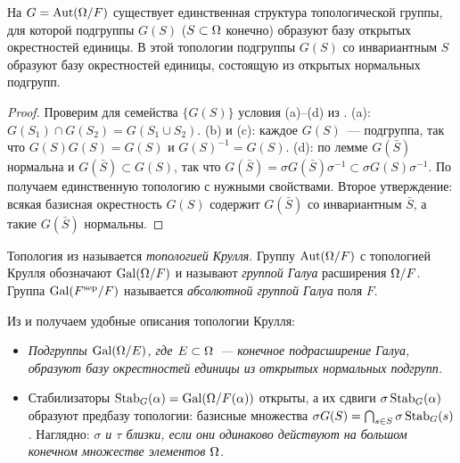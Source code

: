 \begin{proposition}[7.6]
На $G=\operatorname{Aut}(\Omega/F)$ существует единственная структура топологической группы, для которой подгруппы $G(S)$ ($S\subset\Omega$
конечно) образуют базу открытых окрестностей единицы. В этой топологии подгруппы $G(S)$ со инвариантным $S$ образуют базу
окрестностей единицы, состоящую из открытых нормальных подгрупп.
\end{proposition}

\begin{proof}
Проверим для семейства $\{G(S)\}$ условия (a)--(d) из . (a): $G(S_1)\cap G(S_2)=G(S_1\cup S_2)$. (b) и (c): каждое
$G(S)$~--- подгруппа, так что $G(S)G(S)=G(S)$ и $G(S)^{-1}=G(S)$. (d): по лемме  $G(\bar S)$ нормальна и
$G(\bar S)\subset G(S)$, так что $G(\bar S)=\sigma G(\bar S)\sigma^{-1}\subset\sigma G(S)\sigma^{-1}$. По  получаем
единственную топологию с нужными свойствами. Второе утверждение: всякая базисная окрестность $G(S)$ содержит $G(\bar S)$
со инвариантным $\bar S$, а такие $G(\bar S)$ нормальны.
\end{proof}

\begin{definition}
Топология из  называется \emph{топологией Крулля}. Группу $\operatorname{Aut}(\Omega/F)$ с топологией Крулля обозначают $\operatorname{Gal}(\Omega/F)$ и
называют \emph{группой Галуа} расширения $\Omega/F$. Группа $\operatorname{Gal}(F^{\mathrm{sep}}/F)$ называется \emph{абсолютной группой Галуа}
поля $F$.
\end{definition}

Из  и  получаем удобные описания топологии Крулля:
\begin{itemize}[leftmargin=*]
\item \emph{Подгруппы $\operatorname{Gal}(\Omega/E)$, где $E\subset\Omega$~--- конечное подрасширение Галуа, образуют базу окрестностей
единицы из открытых нормальных подгрупп.}
\item Стабилизаторы $\operatorname{Stab}_G(\alpha)=\operatorname{Gal}(\Omega/F(\alpha))$ открыты, а их сдвиги $\sigma\operatorname{Stab}_G(\alpha)$ образуют предбазу
топологии: базисные множества $\sigma G(S)=\bigcap_{s\in S}\sigma\operatorname{Stab}_G(s)$. Наглядно: \emph{$\sigma$ и $\tau$ близки,
если они одинаково действуют на большом конечном множестве элементов $\Omega$.}
\end{itemize}

